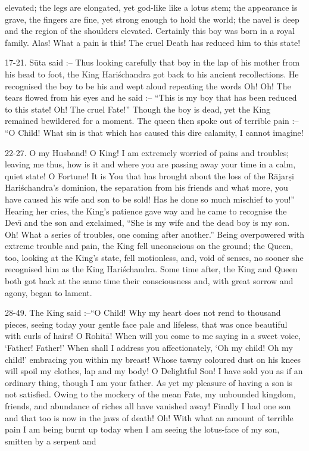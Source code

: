 elevated; the legs are elongated, yet god-like like a lotus stem; the appearance is grave, the fingers are fine, yet strong enough to hold the world; the navel is deep and the region of the shoulders elevated. Certainly this boy was born in a royal family. Alas! What a pain is this! The cruel Death has reduced him to this state!

17-21. S\=uta said :-- Thus looking carefully that boy in the lap of his mother from his head to foot, the King Hari\'schandra got back to his ancient recollections. He recognised the boy to be his and wept aloud repeating the words Oh! Oh! The tears flowed from his eyes and he said :-- ``This is my boy that has been reduced to this state! Oh! The cruel Fate!'' Though the boy is dead, yet the King remained bewildered for a moment. The queen then spoke out of terrible pain :-- ``O Child! What sin is that which has caused this dire calamity, I cannot imagine!

22-27. O my Husband! O King! I am extremely worried of pains and troubles; leaving me thus, how is it and where you are passing away your time in a calm, quiet state! O Fortune! It is You that has brought about the loss of the R\=ajar\d{s}i Hari\'schandra's dominion, the separation from his friends and what more, you have caused his wife and son to be sold! Has he done so much mischief to you!'' Hearing her cries, the King's patience gave way and he came to recognise the Dev\={\i} and the son and exclaimed, ``She is my wife and the dead boy is my son. Oh! What a series of troubles, one coming after another.'' Being overpowered with extreme trouble and pain, the King fell unconscious on the ground; the Queen, too, looking at the King's state, fell motionless, and, void of senses, no sooner she recognised him as the King Hari\'schandra. Some time after, the King and Queen both got back at the same time their consciousness and, with great sorrow and agony, began to lament.

28-49. The King said :--``O Child! Why my heart does not rend to thousand pieces, seeing today your gentle face pale and lifeless, that was once beautiful with curls of hairs! O Rohit\=a! When will you come to me saying in a sweet voice, `Father! Father!' When shall I address you affectionately, `Oh my child! Oh my child!' embracing you within my breast! Whose tawny coloured dust on his knees will spoil my clothes, lap and my body! O Delightful Son! I have sold you as if an ordinary thing, though I am your father. As yet my pleasure of having a son is not satisfied. Owing to the mockery of the mean Fate, my unbounded kingdom, friends, and abundance of riches all have vanished away! Finally I had one son and that too is now in the jaws of death! Oh! With what an amount of terrible pain I am being burnt up today when I am seeing the lotus-face of my son, smitten by a serpent and

